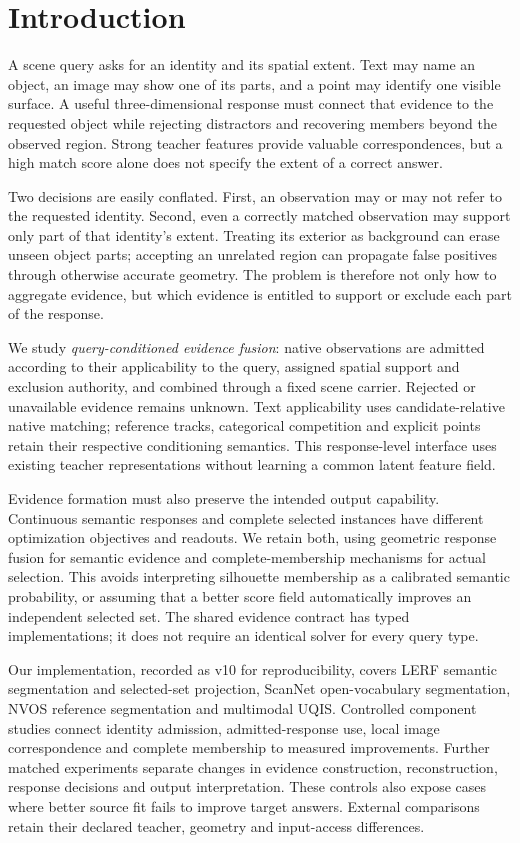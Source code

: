 \section{Introduction}
A scene query asks for an identity and its spatial extent. Text may name an
object, an image may show one of its parts, and a point may identify one visible
surface. A useful three-dimensional response must connect that evidence to the
requested object while rejecting distractors and recovering members beyond the
observed region. Strong teacher features provide valuable correspondences, but
a high match score alone does not specify the extent of a correct answer.

Two decisions are easily conflated. First, an observation may or may not refer
to the requested identity. Second, even a correctly matched observation may
support only part of that identity's extent. Treating its exterior as background
can erase unseen object parts; accepting an unrelated region can propagate
false positives through otherwise accurate geometry. The problem is therefore
not only how to aggregate evidence, but which evidence is entitled to support
or exclude each part of the response.

We study \emph{query-conditioned evidence fusion}: native observations are
admitted according to their applicability to the query, assigned spatial
support and exclusion authority, and combined through a fixed scene carrier.
Rejected or unavailable evidence remains unknown. Text applicability uses
candidate-relative native matching; reference tracks, categorical competition
and explicit points retain their respective conditioning semantics. This
response-level interface uses existing teacher representations without learning
a common latent feature field.

Evidence formation must also preserve the intended output capability.
Continuous semantic responses and complete selected instances have different
optimization objectives and readouts. We retain both, using geometric response
fusion for semantic evidence and complete-membership mechanisms for actual
selection. This avoids interpreting silhouette membership as a calibrated
semantic probability, or assuming that a better score field automatically
improves an independent selected set. The shared evidence contract has typed
implementations; it does not require an identical solver for every query type.

Our implementation, recorded as v10 for reproducibility, covers LERF semantic
segmentation and selected-set projection, ScanNet open-vocabulary segmentation,
NVOS reference segmentation and multimodal UQIS. Controlled component studies
connect identity admission, admitted-response use, local image correspondence
and complete membership to measured improvements. Further matched experiments
separate changes in evidence construction, reconstruction, response decisions
and output interpretation. These controls also expose cases where better source
fit fails to improve target answers. External comparisons retain their declared
teacher, geometry and input-access differences.

